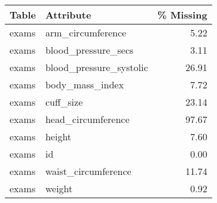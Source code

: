 \begin{tabular}{llr}
\toprule
 \textbf{Table} &                \textbf{Attribute} &  \textbf{\% Missing} \\
\midrule
 exams &        arm\_circumference &       5.22 \\
 exams &      blood\_pressure\_secs &       3.11 \\
 exams &  blood\_pressure\_systolic &      26.91 \\
 exams &          body\_mass\_index &       7.72 \\
 exams &                cuff\_size &      23.14 \\
 exams &       head\_circumference &      97.67 \\
 exams &                   height &       7.60 \\
 exams &                       id &       0.00 \\
 exams &      waist\_circumference &      11.74 \\
 exams &                   weight &       0.92 \\
\bottomrule
\end{tabular}
